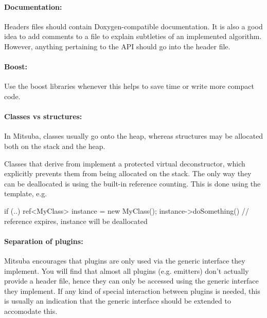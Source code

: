 \paragraph{Documentation:} Headers files should contain
Doxygen-compatible documentation. It is also a good idea to add
comments to a  file to explain subtleties of an implemented algorithm.
However, anything pertaining to the API should go into the header file.

\paragraph{Boost:} Use the boost libraries whenever this helps to save
time or write more compact code.

\paragraph{Classes vs structures:}In Mitsuba, classes usually go onto the heap,
whereas structures may be allocated both on the stack and the heap.

Classes that derive from  implement a protected virtual
deconstructor, which explicitly prevents them from being allocated on the stack.
The only way they can be deallocated is using the built-in reference
counting. This is done using the  template, e.g.

\begin{cpp}
if (..) {
	ref<MyClass> instance = new MyClass();
	instance->doSomething()
}   // reference expires, instance will be deallocated
\end{cpp}

\paragraph{Separation of plugins:}Mitsuba encourages that plugins are only
used via the generic interface they implement. You will find that almost all plugins
(e.g. emitters) don't actually provide a header file, hence they can only be accessed
using the generic  interface they implement. If any kind of special
interaction between plugins is needed, this is usually an indication that the
generic interface should be extended to accomodate this.
